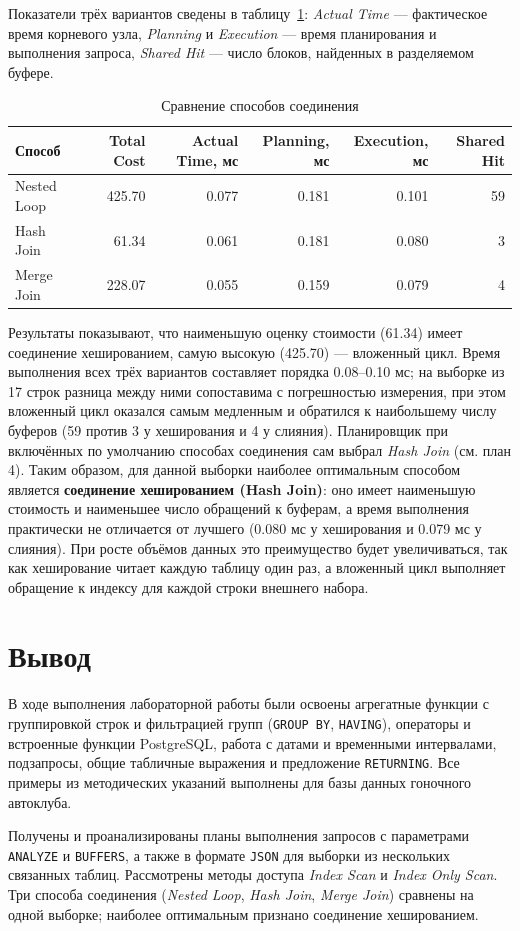 \documentclass[oneside,a4paper,14pt]{extarticle}
\begin{document}
Показатели трёх вариантов сведены в таблицу~\ref{tab:joins}: \textit{Actual Time} --- фактическое время корневого узла, \textit{Planning} и \textit{Execution} --- время планирования и выполнения запроса, \textit{Shared Hit} --- число блоков, найденных в разделяемом буфере.

\begin{table}[H]\centering\footnotesize\caption{Сравнение способов соединения}\label{tab:joins}
\begin{tabular}{|l|r|r|r|r|r|}\hline
\textbf{Способ} & \textbf{Total Cost} & \textbf{Actual Time, мс} & \textbf{Planning, мс} & \textbf{Execution, мс} & \textbf{Shared Hit} \\ \hline
Nested Loop & 425.70 & 0.077 & 0.181 & 0.101 & 59 \\ \hline
Hash Join & 61.34 & 0.061 & 0.181 & 0.080 & 3 \\ \hline
Merge Join & 228.07 & 0.055 & 0.159 & 0.079 & 4 \\ \hline
\end{tabular}\end{table}


Результаты показывают, что наименьшую оценку стоимости (61.34) имеет соединение хешированием, самую высокую (425.70) --- вложенный цикл. Время выполнения всех трёх вариантов составляет порядка 0.08--0.10 мс; на выборке из 17 строк разница между ними сопоставима с погрешностью измерения, при этом вложенный цикл оказался самым медленным и обратился к наибольшему числу буферов (59 против 3 у хеширования и 4 у слияния). Планировщик при включённых по умолчанию способах соединения сам выбрал \textit{Hash Join} (см. план 4). Таким образом, для данной выборки наиболее оптимальным способом является \textbf{соединение хешированием (Hash Join)}: оно имеет наименьшую стоимость и наименьшее число обращений к буферам, а время выполнения практически не отличается от лучшего (0.080 мс у хеширования и 0.079 мс у слияния). При росте объёмов данных это преимущество будет увеличиваться, так как хеширование читает каждую таблицу один раз, а вложенный цикл выполняет обращение к индексу для каждой строки внешнего набора.

\section*{Вывод}

В ходе выполнения лабораторной работы были освоены агрегатные функции с группировкой строк и фильтрацией групп (\texttt{GROUP BY}, \texttt{HAVING}), операторы и встроенные функции PostgreSQL, работа с датами и временными интервалами, подзапросы, общие табличные выражения и предложение \texttt{RETURNING}. Все примеры из методических указаний выполнены для базы данных гоночного автоклуба.

Получены и проанализированы планы выполнения запросов с параметрами \texttt{ANALYZE} и \texttt{BUFFERS}, а также в формате \texttt{JSON} для выборки из нескольких связанных таблиц. Рассмотрены методы доступа \textit{Index Scan} и \textit{Index Only Scan}. Три способа соединения (\textit{Nested Loop}, \textit{Hash Join}, \textit{Merge Join}) сравнены на одной выборке; наиболее оптимальным признано соединение хешированием.
\end{document}
